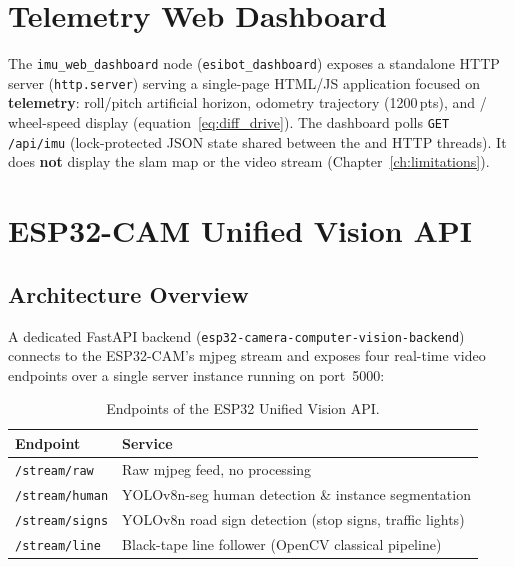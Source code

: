 \section{Telemetry Web Dashboard}
\label{sec:ihm_dashboard}

The \texttt{imu\_web\_dashboard} node (\texttt{esibot\_dashboard}) exposes a standalone HTTP server (\texttt{http.server}) serving a single-page HTML/JS application focused on \textbf{telemetry}: roll/pitch artificial horizon, odometry trajectory (1200\,pts), and / wheel-speed display (equation~\ref{eq:diff_drive}). The dashboard polls \texttt{GET /api/imu} (lock-protected JSON state shared between the \ros{} and HTTP threads). It does \textbf{not} display the \gls{slam} map or the video stream (Chapter~\ref{ch:limitations}).

\section{ESP32-CAM Unified Vision API}
\label{sec:ihm_camera}

\subsection{Architecture Overview}
\label{sec:ihm_camera_arch}

A dedicated FastAPI backend (\texttt{esp32-camera-computer-vision-backend}) connects to the
ESP32-CAM's \gls{mjpeg} stream and exposes four real-time video endpoints over a single
server instance running on port~5000:

\begin{table}[H]
	\centering
	\caption{Endpoints of the ESP32 Unified Vision API.}
	\label{tab:vision_endpoints}
	\begin{tabularx}{\linewidth}{L{3.2cm} L{8.6cm}}
		\toprule
		\textbf{Endpoint} & \textbf{Service} \\
		\midrule
		\texttt{/stream/raw} & Raw \gls{mjpeg} feed, no processing \\
		\texttt{/stream/human} & YOLOv8n-seg human detection \& instance segmentation \\
		\texttt{/stream/signs} & YOLOv8n road sign detection (stop signs, traffic lights) \\
		\texttt{/stream/line} & Black-tape line follower (OpenCV classical pipeline) \\
		\bottomrule
	\end{tabularx}
\end{table}

